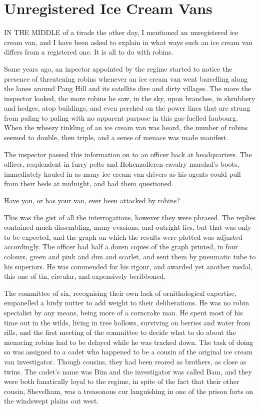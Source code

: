 \chapter{Unregistered Ice Cream Vans}

IN THE MIDDLE of a tirade the other day, I mentioned an unregistered ice cream van, and I have been asked to explain in what ways such an ice cream van differs from a registered one. It is all to do with robins.

Some years ago, an inpector appointed by the regime started to notice the presence of threatening robins whenever an ice cream van went barrelling along the lanes around Pang Hill and its satellite dire and dirty villages. The more the inspector looked, the more robins he saw, in the sky, upon branches, in shrubbery and hedges, atop buildings, and even perched on the power lines that are strung from paling to paling with no apparent purpose in this gas-fuelled faubourg. When the wheezy tinkling of an ice cream van was heard, the number of robins seemed to double, then triple, and a sense of menace was made manifest.

The inspector passed this information on to an officer back at headquarters. The officer, resplendent in furry pelts and Hohenzolleren cavalry marshal's boots, immediately hauled in as many ice cream van drivers as his agents could pull from their beds at midnight, and had them questioned.

Have you, or has your van, ever been attacked by robins?

This was the gist of all the interrogations, however they were phrased. The replies contained much dissembling, many evasions, and outright lies, but that was only to be expected, and the graph on which the results were plotted was adjusted accordingly. The officer had half a dozen copies of the graph printed, in four colours, green and pink and dun and scarlet, and sent them by pneumatic tube to his superiors. He was commended for his rigour, and awarded yet another medal, this one of tin, circular, and expensively beribboned.

The committee of six, recognising their own lack of ornithological expertise, empanelled a birdy nutter to add weight to their deliberations. He was no robin specialist by any means, being more of a corncrake man. He spent most of his time out in the wilds, living in tree hollows, surviving on berries and water from rills, and the first meeting of the committee to decide what to do about the menacing robins had to be delayed while he was tracked down. The task of doing so was assigned to a cadet who happened to be a cousin of the original ice cream van investigator. Though cousins, they had been reared as brothers, as close as twins. The cadet's name was Bim and the investigator was called Bam, and they were both fanatically loyal to the regime, in spite of the fact that their other cousin, Shevelham, was a treasonous cur languishing in one of the prison forts on the windswept plains out west.

